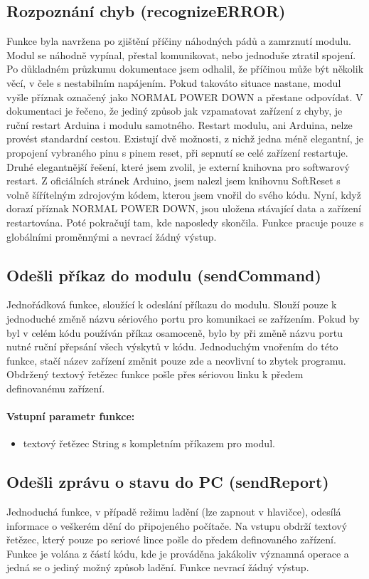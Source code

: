\documentclass[FM,MP]{tulthesis}  %
\begin{document}
\subsection{Rozpoznání chyb (recognizeERROR)}
Funkce byla navržena po zjištění příčiny náhodných pádů a zamrznutí modulu. Modul se náhodně vypínal, přestal komunikovat, nebo jednoduše ztratil spojení. Po důkladném průzkumu dokumentace \cite{ROBOT SW} jsem odhalil, že příčinou může být několik věcí, v čele s nestabilním napájením. Pokud takováto situace nastane, modul vyšle příznak označený jako NORMAL POWER DOWN a přestane odpovídat. V dokumentaci je řečeno, že jediný způsob jak vzpamatovat zařízení z chyby, je ruční restart Arduina i modulu samotného. Restart modulu, ani Arduina, nelze provést standardní cestou. Existují dvě možnosti, z nichž jedna méně elegantní, je propojení vybraného pinu s pinem reset, při sepnutí se celé zařízení restartuje. Druhé elegantnější řešení, které jsem zvolil, je externí knihovna pro softwarový restart. Z oficiálních stránek Arduino, jsem nalezl jsem knihovnu SoftReset \cite{SoftReset} s volně šířítelným zdrojovým kódem, kterou jsem vnořil do svého kódu. Nyní, když dorazí příznak NORMAL POWER DOWN, jsou uložena stávající data a zařízení restartována. Poté pokračují tam, kde naposledy skončila. Funkce pracuje pouze s globálními proměnnými a nevrací žádný výstup.

\subsection{Odešli příkaz do modulu (sendCommand)}
Jednořádková funkce, sloužící k odeslání příkazu do modulu. Slouží pouze k jednoduché změně názvu sériového portu pro komunikaci se zařízením. Pokud by byl v celém kódu používán příkaz osamoceně, bylo by při změně názvu portu nutné ruční přepsání všech výskytů v kódu. Jednoduchým vnořením do této funkce, stačí název zařízení změnit pouze zde a neovlivní to zbytek programu. Obdržený textový řetězec funkce pošle přes sériovou linku k předem definovanému zařízení.

\paragraph{Vstupní parametr funkce:}
\begin{itemize}
\item textový řetězec String s kompletním příkazem pro modul.
\end{itemize}

\subsection{Odešli zprávu o stavu do PC (sendReport)}
Jednoduchá funkce, v případě režimu ladění (lze zapnout v hlavičce), odesílá informace o veškerém dění do připojeného počítače. Na vstupu obdrží textový řetězec, který pouze po seriové lince pošle do předem definovaného zařízení. Funkce je volána z částí kódu, kde je prováděna jakákoliv významná operace a jedná se o jediný možný způsob ladění. Funkce nevrací žádný výstup.
\end{document}
